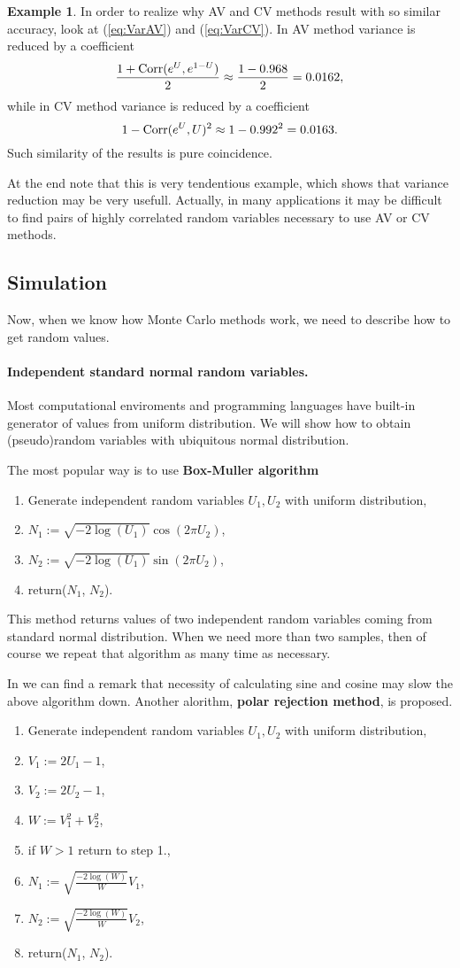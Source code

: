 \documentclass[a4paper,12pt, oneside]{book}
\theoremstyle{definition}
\newtheorem{example}{Example}[section]
\theoremstyle{remark}
\def\Corr{{\hbox{Corr}}}
\begin{document}
\begin{example}
In order to realize why AV and CV methods result with so similar accuracy, look at (\ref{eq:VarAV}) and (\ref{eq:VarCV}). In AV method variance is reduced by a coefficient
\[ \frac{1 + \Corr(e^U, e^{1-U})}{2} \approx \frac{1 - 0.968}{2} = 0.0162, \]
while in CV method variance is reduced by a coefficient
\[ 1 - \Corr(e^U, U)^2 \approx 1 - 0.992^2 = 0.0163. \]
Such similarity of the results is pure coincidence.

At the end note that this is very tendentious example, which shows that variance reduction may be very usefull. Actually, in many applications it may be difficult to find pairs of highly correlated random variables necessary to use AV or CV methods.
\end{example}


\subsection{Simulation}
Now, when we know how Monte Carlo methods work, we need to describe how to get random values.
\paragraph{Independent standard normal random variables.} Most computational enviroments and programming languages have built-in generator of values from uniform distribution. We will show how to obtain (pseudo)random variables with ubiquitous normal distribution.

The most popular way is to use \textbf{Box-Muller algorithm}
\begin{enumerate}
 \item Generate independent random variables $U_1, U_2$ with uniform distribution,
 \item $N_1 := \sqrt{-2\log(U_1)} \cos(2\pi U_2)$,
 \item $N_2 := \sqrt{-2\log(U_1)} \sin(2\pi U_2)$,
 \item return($N_1$, $N_2$).
\end{enumerate}
This method returns values of two independent random variables coming from standard normal distribution. When we need more than two samples, then of course we repeat that algorithm as many time as necessary.

In \cite{london} we can find a remark that necessity of calculating sine and cosine may slow the above algorithm down. Another alorithm, \textbf{polar rejection method}, is proposed.
\begin{enumerate}
 \item Generate independent random variables $U_1, U_2$ with uniform distribution,
 \item $V_1 := 2U_1-1$,
 \item $V_2 := 2U_2-1$,
 \item $W := V_1^2 + V_2^2$,
 \item if $W > 1$ return to step 1.,
 \item $N_1 := \sqrt{\frac{-2\log(W)}{W}} V_1$,
 \item $N_2 := \sqrt{\frac{-2\log(W)}{W}} V_2$,
 \item return($N_1$, $N_2$).
\end{enumerate}
\end{document}
